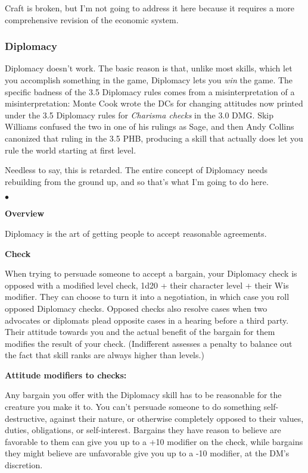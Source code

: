 Craft is broken, but I'm not going to address it here because it requires a more comprehensive revision of the economic system.

\subsubsection{Diplomacy}

Diplomacy doesn't work. The basic reason is that, unlike most skills, which let you accomplish something in the game, Diplomacy lets you \textit{win} the game. The specific badness of the 3.5 Diplomacy rules comes from a misinterpretation of a misinterpretation: Monte Cook wrote the DCs for changing attitudes now printed under the 3.5 Diplomacy rules for \textit{Charisma checks} in the 3.0 DMG. Skip Williams confused the two in one of his rulings as Sage, and then Andy Collins canonized that ruling in the 3.5 PHB, producing a skill that actually does let you rule the world starting at first level.

Needless to say, this is retarded. The entire concept of Diplomacy needs rebuilding from the ground up, and so that's what I'm going to do here.

\begin{list}{$\bullet$}{\itemspace}
	\item\textbf{Overview}

	Diplomacy is the art of getting people to accept reasonable agreements.
	\item\textbf{Check}

	When trying to persuade someone to accept a bargain, your Diplomacy check is opposed with a modified level check, 1d20 + their character level + their Wis modifier. They can choose to turn it into a negotiation, in which case you roll opposed Diplomacy checks. Opposed checks also resolve cases when two advocates or diplomats plead opposite cases in a hearing before a third party. Their attitude towards you and the actual benefit of the bargain for them modifies the result of your check. (Indifferent assesses a penalty to balance out the fact that skill ranks are always higher than levels.)

	\item\textbf{Attitude modifiers to checks:}
	\listtwo
	\end{list}

	Any bargain you offer with the Diplomacy skill has to be reasonable for the creature you make it to. You can't persuade someone to do something self-destructive, against their nature, or otherwise completely opposed to their values, duties, obligations, or self-interest. Bargains they have reason to believe are favorable to them can give you up to a +10 modifier on the check, while bargains they might believe are unfavorable give you up to a -10 modifier, at the DM's discretion.


